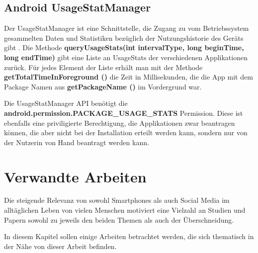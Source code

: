 \subsection {Android UsageStatManager}

Der UsageStatManager ist eine Schnittstelle, die Zugang zu vom Betriebssystem gesammelten Daten
und Statistiken bezüglich der Nutzungshistorie des Geräts gibt \cite{androidusagestat}.
Die Methode \textbf{queryUsageStats(int intervalType, long beginTime, long endTime)} gibt eine Liste an UsageStats der verschiedenen Applikationen zurück.
Für jedes Element der Liste erhält man mit der Methode \textbf{getTotalTimeInForeground ()} die Zeit in Millisekunden,
die die App mit dem Package Namen aus \textbf{getPackageName ()} im Vordergrund war.
\par
Die UsageStatManager API benötigt die \textbf{android.permission.PACKAGE\_USAGE\_STATS} Permission.
Diese ist ebenfalls eine priviligierte Berechtigung, die Applikationen zwar beantragen können, die aber nicht bei der Installation erteilt werden kann, sondern nur von der Nutzerin von Hand beantragt werden kann.


\section{Verwandte Arbeiten}
\label{ch:Grundlagen:sec:RelatedWork}

Die steigende Relevanz von sowohl Smartphones als auch Social Media im alltäglichen Leben von vielen Menschen
motiviert eine Vielzahl an Studien und Papern sowohl zu jeweils den beiden Themen als auch der Überschneidung. 

In diesem Kapitel sollen einige Arbeiten betrachtet werden, die sich thematisch in der Nähe von dieser Arbeit befinden.



